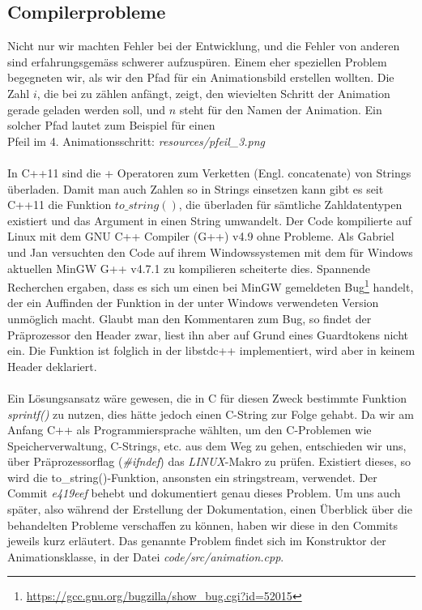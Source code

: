 \documentclass[12pt,a4paper]{scrartcl}
\begin{document}
\subsection{Compilerprobleme}
Nicht nur wir machten Fehler bei der Entwicklung, und die Fehler von anderen sind erfahrungsgemäss schwerer aufzuspüren.
Einem eher speziellen Problem begegneten wir, als wir den Pfad für ein Animationsbild erstellen wollten.
Die Zahl $i$, die bei zu zählen anfängt, zeigt, den wievielten Schritt der Animation gerade geladen werden soll, und $n$ steht für den Namen der Animation.
Ein solcher Pfad lautet zum Beispiel für einen\\Pfeil im 4. Animationsschritt: \textit{resources/pfeil\_3.png}\\
\\
In C++11 sind die + Operatoren zum Verketten (Engl. concatenate) von Strings überladen. Damit man auch Zahlen so in Strings einsetzen
kann gibt es seit C++11 die Funktion $to\_string()$, die überladen für sämtliche Zahldatentypen existiert und das Argument in einen String
umwandelt. Der Code kompilierte auf Linux mit dem GNU C++ Compiler (G++) v4.9 ohne Probleme. Als Gabriel und Jan versuchten den Code auf ihrem Windowssystemen
mit dem für Windows aktuellen MinGW G++ v4.7.1 zu kompilieren scheiterte dies. Spannende Recherchen ergaben, dass es sich um einen bei MinGW
gemeldeten Bug\footnote{\url{https://gcc.gnu.org/bugzilla/show_bug.cgi?id=52015}} handelt, der ein Auffinden der Funktion in der unter Windows verwendeten
Version unmöglich macht. Glaubt man den Kommentaren zum Bug, so findet der Präprozessor den Header zwar, liest ihn aber auf Grund eines Guardtokens nicht ein.
Die Funktion ist folglich in der libstdc++ implementiert, wird aber in keinem Header deklariert.\\
\\
Ein Lösungsansatz wäre gewesen, die in C für diesen Zweck bestimmte Funktion \textit{sprintf()} zu nutzen, dies hätte jedoch einen C-String zur Folge gehabt.
Da wir am Anfang C++ als Programmiersprache wählten, um den C-Problemen wie Speicherverwaltung, C-Strings, etc. aus dem Weg zu gehen, entschieden wir uns, über
Präprozessorflag (\textit{\#ifndef}) das \textit{LINUX}-Makro zu prüfen. Existiert dieses, so wird die to\_string()-Funktion, ansonsten ein stringstream, verwendet.
Der Commit \textit{e419eef} behebt und dokumentiert genau dieses Problem. Um uns auch später, also während der Erstellung der Dokumentation, einen Überblick
über die behandelten Probleme verschaffen zu können, haben wir diese in den Commits jeweils kurz erläutert. Das genannte Problem findet sich im
Konstruktor der Animationsklasse, in der Datei \textit{code/src/animation.cpp}.
\end{document}
